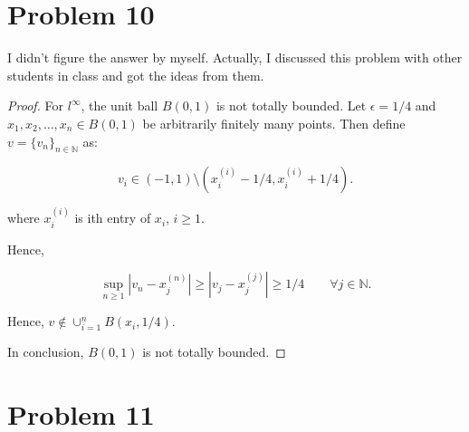 \documentclass[12pt]{article}
\begin{document}
\section*{Problem 10}

{
\color{red} I didn't figure the answer by myself. Actually, I discussed this problem with other students in class and got the ideas from them. 
}
\begin{proof}

For $l^\infty$, the unit ball $B(0, 1)$ is not totally bounded. Let $\epsilon = 1/4$ and $x_1, x_2, \dots, x_n \in B(0,1)$ be arbitrarily finitely many points. Then define $v = \{v_n\}_{n\in\mathbb N}$ as:

$$
v_i \in (-1, 1) \setminus (x_i^{(i)} - 1/4, x_i^{(i)} + 1/4).
$$

where $x_i^{(i)}$ is ith entry of $x_i$, $i \geqslant 1$. 

Hence, 

$$
\sup_{n \geqslant 1} |v_n -x_j^{(n)}| \geqslant |v_j - x_j^{(j)}| \geqslant 1/4 \qquad \forall j \in \mathbb N.
$$

Hence, $v \notin \cup _{i=1}^n B(x_i, 1/4)$.

In conclusion, $B(0,1)$ is not totally bounded.

\end{proof}





\section*{Problem 11}
\end{document}
